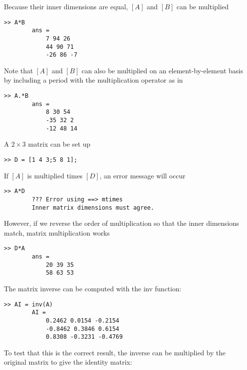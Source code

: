 \documentclass[../main.tex]{subfiles}
\begin{document}
\begin{example}
    \noindent Because their inner dimensions are equal, $[A]$ and $[B]$ can be multiplied

    \begin{lstlisting}[numbers=none,frame=none]
        >> A*B
        ans =
            7 94 26
            44 90 71
            -26 86 -7
	\end{lstlisting}

    \noindent Note that $[A]$ and $[B]$ can also be multiplied on an element-by-element basis by including a period with the multiplication operator as in

    \begin{lstlisting}[numbers=none,frame=none]
        >> A.*B
        ans =
            8 30 54
            -35 32 2
            -12 48 14
	\end{lstlisting}

    \noindent A $2 \times 3$ matrix can be set up

    \begin{lstlisting}[numbers=none,frame=none]
        >> D = [1 4 3;5 8 1];
	\end{lstlisting}

    \noindent If $[A]$ is multiplied times $[D]$, an error message will occur

    \begin{lstlisting}[numbers=none,frame=none]
        >> A*D
        ??? Error using ==> mtimes
        Inner matrix dimensions must agree.
	\end{lstlisting}

    \noindent However, if we reverse the order of multiplication so that the inner dimensions match, matrix multiplication works

    \begin{lstlisting}[numbers=none,frame=none]
        >> D*A
        ans =
            20 39 35
            58 63 53
	\end{lstlisting}

    \noindent The matrix inverse can be computed with the inv function:

    \begin{lstlisting}[numbers=none,frame=none]
        >> AI = inv(A)
        AI =
            0.2462 0.0154 -0.2154
            -0.8462 0.3846 0.6154
            0.8308 -0.3231 -0.4769
	\end{lstlisting}

    \noindent To test that this is the correct result, the inverse can be multiplied by the original matrix to give the identity matrix:


\end{example}
\end{document}
